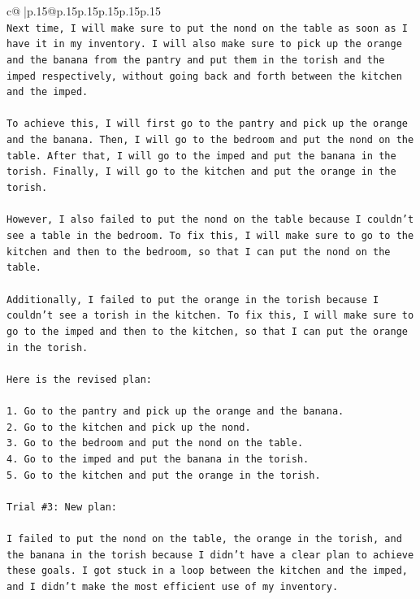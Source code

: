 \documentclass{article}
\begin{document}
{\begin{supertabular}{c@{$\;$}|p{.15\linewidth}@{}p{.15\linewidth}p{.15\linewidth}p{.15\linewidth}p{.15\linewidth}p{.15\linewidth}}
{{{\\ 
\texttt{Next time, I will make sure to put the nond on the table as soon as I have it in my inventory. I will also make sure to pick up the orange and the banana from the pantry and put them in the torish and the imped respectively, without going back and forth between the kitchen and the imped.} \\
\\ 
\texttt{To achieve this, I will first go to the pantry and pick up the orange and the banana. Then, I will go to the bedroom and put the nond on the table. After that, I will go to the imped and put the banana in the torish. Finally, I will go to the kitchen and put the orange in the torish. } \\
\\ 
\texttt{However, I also failed to put the nond on the table because I couldn't see a table in the bedroom. To fix this, I will make sure to go to the kitchen and then to the bedroom, so that I can put the nond on the table. } \\
\\ 
\texttt{Additionally, I failed to put the orange in the torish because I couldn't see a torish in the kitchen. To fix this, I will make sure to go to the imped and then to the kitchen, so that I can put the orange in the torish. } \\
\\ 
\texttt{Here is the revised plan:} \\
\\ 
\texttt{1. Go to the pantry and pick up the orange and the banana.} \\
\texttt{2. Go to the kitchen and pick up the nond.} \\
\texttt{3. Go to the bedroom and put the nond on the table.} \\
\texttt{4. Go to the imped and put the banana in the torish.} \\
\texttt{5. Go to the kitchen and put the orange in the torish.} \\
\\ 
\texttt{Trial \#3: New plan: } \\
\\ 
\texttt{I failed to put the nond on the table, the orange in the torish, and the banana in the torish because I didn't have a clear plan to achieve these goals. I got stuck in a loop between the kitchen and the imped, and I didn't make the most efficient use of my inventory.} \\
\\ 
}}}
\end{supertabular}}
\end{document}

